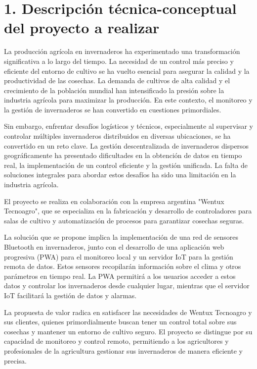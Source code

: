 \documentclass[
11pt, %
]{charter}
\begin{document}
\section{1. Descripción técnica-conceptual del proyecto a realizar}
\label{sec:descripcion}

La producción agrícola en invernaderos ha experimentado una transformación significativa a lo largo del tiempo. La necesidad de un control más preciso y eficiente del entorno de cultivo se ha vuelto esencial para asegurar la calidad y la productividad de las cosechas. La demanda de cultivos de alta calidad y el crecimiento de la población mundial han intensificado la presión sobre la industria agrícola para maximizar la producción. En este contexto, el monitoreo y la gestión de invernaderos se han convertido en cuestiones primordiales.

Sin embargo, enfrentar desafíos logísticos y técnicos, especialmente al supervisar y controlar múltiples invernaderos distribuidos en diversas ubicaciones, se ha convertido en un reto clave. La gestión descentralizada de invernaderos dispersos geográficamente ha presentado dificultades en la obtención de datos en tiempo real, la implementación de un control eficiente y la gestión unificada. La falta de soluciones integrales para abordar estos desafíos ha sido una limitación en la industria agrícola.

El proyecto se realiza en colaboración con la empresa argentina "Wentux Tecnoagro", que se especializa en la fabricación y desarrollo de controladores para salas de cultivo y automatización de procesos para garantizar cosechas seguras.

La solución que se propone implica la implementación de una red de sensores Bluetooth en invernaderos, junto con el desarrollo de una aplicación web progresiva (PWA) para el monitoreo local y un servidor IoT para la gestión remota de datos. Estos sensores recopilarán información sobre el clima y otros parámetros en tiempo real. La PWA permitirá a los usuarios acceder a estos datos y controlar los invernaderos desde cualquier lugar, mientras que el servidor IoT facilitará la gestión de datos y alarmas.

La propuesta de valor radica en satisfacer las necesidades de Wentux Tecnoagro y sus clientes, quienes primordialmente buscan tener un control total sobre sus cosechas y mantener un entorno de cultivo seguro. El proyecto se distingue por su capacidad de monitoreo y control remoto, permitiendo a los agricultores y profesionales de la agricultura gestionar sus invernaderos de manera eficiente y precisa.
\end{document}
